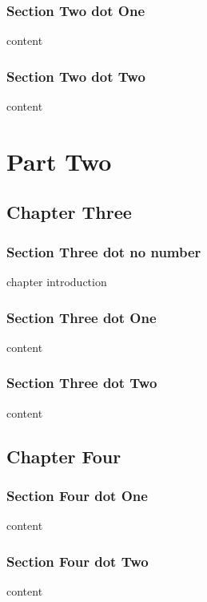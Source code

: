 \documentclass[openany]{book}
\begin{document}
\section{Section Two dot One}
content

\section{Section Two dot Two}
content

\part*{Part Two}

\chapter{Chapter Three}

\section*{Section Three dot no number}
chapter introduction

\section{Section Three dot One}
content

\section{Section Three dot Two}
content

\chapter{Chapter Four}
\section{Section Four dot One}
content

\section{Section Four dot Two}
content
\end{document}
